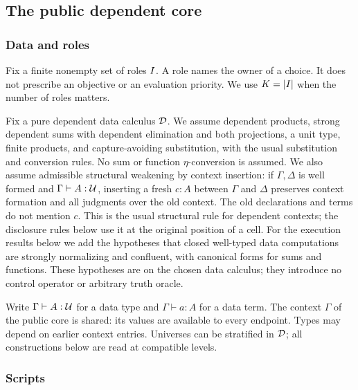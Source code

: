 \subsection{The public dependent core}
\label{sec:core}

\subsubsection{Data and roles}

Fix a finite nonempty set of roles $I$. A role names the owner of a
choice. It does not prescribe an objective or an evaluation priority. We use
$K=|I|$ when the number of roles matters.

Fix a pure dependent data calculus $\mathcal D$. We assume dependent products, strong
dependent sums with dependent elimination and both projections, a unit type,
finite products, and capture-avoiding substitution, with the usual
substitution and conversion rules. No sum or function $\eta$-conversion is
assumed. We also assume admissible structural weakening by context insertion:
if $\Gamma,\Delta$ is well formed and $\Gamma\vdash A:\mathcal U$, inserting a
fresh $c:A$ between $\Gamma$ and $\Delta$ preserves context formation and
all judgments over the old context. The old declarations and terms do not
mention $c$. This is the usual structural rule for dependent contexts;
the disclosure rules below use it at the original position of a cell.
For the execution results below we
add the hypotheses that closed well-typed data computations are strongly
normalizing and confluent, with canonical forms for sums and functions.
These hypotheses are on the chosen data calculus; they introduce no control
operator or arbitrary truth oracle.

Write $\Gamma\vdash A:\mathcal U$ for a data type and $\Gamma\vdash a:A$ for a data
term. The context $\Gamma$ of the public core is shared: its values are
available to every endpoint. Types may depend on earlier context entries.
Universes can be stratified in $\mathcal D$; all constructions below are read at
compatible levels.

\subsubsection{Scripts}

